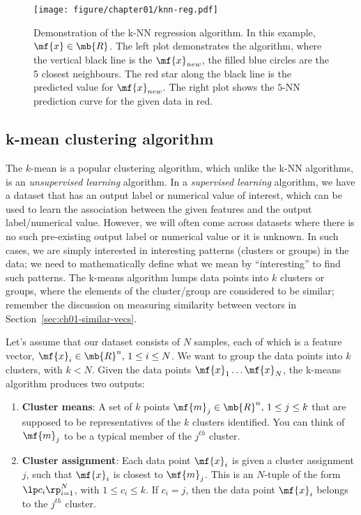 \begin{figure}
    \centering
    \texttt{[image: figure/chapter01/knn-reg.pdf]}
    \caption{Demonstration of the k-NN regression algorithm. In this example, $\mf{x} \in \mb{R}$. The left plot demonstrates the algorithm, where the vertical black line is the $\mf{x}_{new}$, the filled blue circles are the 5 closest neighbours. The red star along the black line is the predicted value for $\mf{x}_{new}$. The right plot shows the $5$-NN prediction curve for the given data in red.}
    \label{fig:ch01-knn-reg-demo}
\end{figure}

\subsection{k-mean clustering algorithm}
The $k$-mean is a popular clustering algorithm, which unlike the k-NN algorithms, is an \textit{unsupervised learning} algorithm. In a \textit{supervised learning} algorithm, we have a dataset that has an output label or numerical value of interest, which can be used to learn the association between the given features and the output label/numerical value. However, we will often come across datasets where there is no such pre-existing output label or numerical value or it is unknown. In such cases, we are simply interested in interesting patterns (clusters or groups) in the data; we need to mathematically define what we mean by ``interesting'' to find such patterns. The k-means algorithm lumps data points into $k$ clusters or groups, where the elements of the cluster/group are considered to be similar; remember the discussion on measuring similarity between vectors in Section~\ref{sec:ch01-similar-vecs}.

Let's assume that our dataset consists of $N$ samples, each of which is a feature vector, $\mf{x}_i \in \mb{R}^n, \, 1 \leq i \leq N$. We want to group the data points into $k$ clusters, with $k < N$. Given the data points $\mf{x}_1 \ldots \mf{x}_N$, the k-means algorithm produces two outputs:
\begin{enumerate}
    \item \textbf{Cluster means}: A set of $k$ points $\mf{m}_j \in \mb{R}^n, \, 1 \leq j \leq k$ that are supposed to be representatives of the $k$ clusters identified. You can think of $\mf{m}_j$ to be a typical member of the $j^{th}$ cluster.
    \item \textbf{Cluster assignment}: Each data point $\mf{x}_i$ is given a cluster assignment $j$, such that $\mf{x}_i$ is closest to $\mf{m}_j$. This is an $N$-tuple of the form $\lp c_i \rp_{i=1}^N$, with $1 \leq c_i \leq k$. If $c_i = j$, then the data point $\mf{x}_i$ belongs to the $j^{th}$ cluster.
\end{enumerate}

